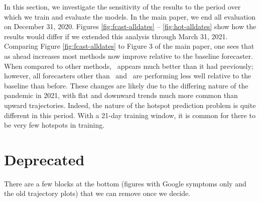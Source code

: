 In this section, we investigate the sensitivity of the results to the
period over which we train and evaluate the models.  In the main
paper, we end all evaluation on December 31, 2020.  Figures
\ref{fig:fcast-alldates} -- \ref{fig:hot-alldates} show how the
results would differ if we extended this analysis through March
  31, 2021. Comparing Figure \ref{fig:fcast-alldates} to Figure 3 of
the main paper, one sees that as ahead increases most methods now improve
relative to the baseline forecaster. When compared to other methods, 
\chngcli~appears much better than
it had previously; however, all forecasters other than \chngcov~and
\dv~are performing less well relative to the baseline than before.
These changes are likely due to the differing nature of the pandemic
in 2021, with flat and downward trends much more common than upward
trajectories.  Indeed, the nature of the hotspot prediction problem is
quite different in this period.  With a 21-day training window, it is
common for there to be very few hotspots in training.

\section{Deprecated}

There are a few blocks at the bottom (figures with Google symptoms only and the
old trajectory plots) that we can remove once we decide.








